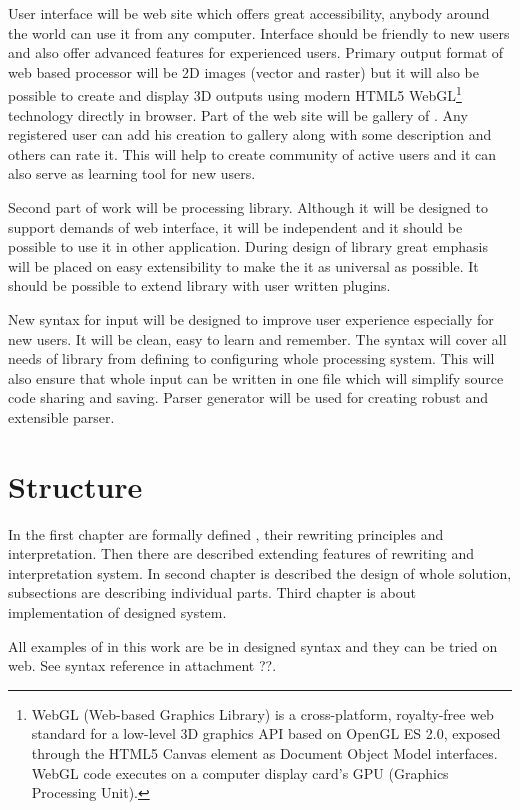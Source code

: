 User interface will be web site which offers great accessibility, anybody around the world can use it from any computer.
Interface should be friendly to new users and also offer advanced features for experienced users.
Primary output format of web based \lsystem processor will be 2D images (vector and raster) but it will also be possible to create and display 3D outputs using modern HTML5 WebGL\footnote{
	WebGL (Web-based Graphics Library) is a cross-platform, royalty-free web standard for a low-level 3D graphics API based on OpenGL ES 2.0, exposed through the HTML5 Canvas element as Document Object Model interfaces.
	WebGL code executes on a computer display card's GPU (Graphics Processing Unit).} technology directly in browser.
Part of the web site will be gallery of \lsystems.
Any registered user can add his creation to gallery along with some description and others can rate it.
This will help to create community of active users and it can also serve as learning tool for new users.

Second part of work will be \lsystem processing library.
Although it will be designed to support demands of web interface, it will be independent and it should be possible to use it in other application.
During design of library great emphasis will be placed on easy extensibility to make the it as universal as possible.
It should be possible to extend library with user written plugins.

New syntax for input will be designed to improve user experience especially for new users.
It will be clean, easy to learn and remember.
The syntax will cover all needs of library from defining \lsystems to configuring whole processing system.
This will also ensure that whole input can be written in one file which will simplify source code sharing and saving.
Parser generator will be used for creating robust and extensible parser.


\section*{Structure}

In the first chapter are formally defined \lsystems, their rewriting principles and interpretation.
Then there are described extending features of \lsystem rewriting and interpretation system.
In second chapter is described the design of whole solution, subsections are describing individual parts.
Third chapter is about implementation of designed system.

All examples of \lsystems in this work are be in designed syntax and they can be tried on web.
See syntax reference in attachment ??.
































